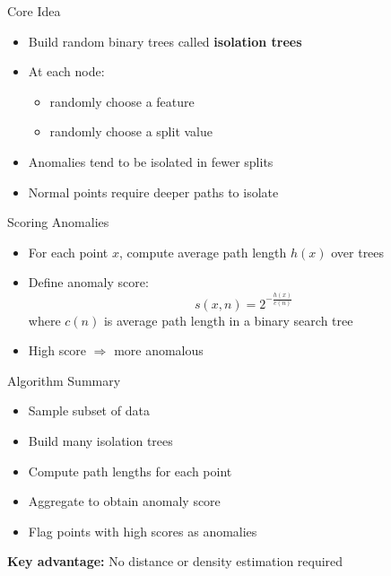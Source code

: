 \begin{frame}{Core Idea}
\begin{itemize}
    \item Build random binary trees called \textbf{isolation trees}
    \item At each node:
    \begin{itemize}
        \item randomly choose a feature
        \item randomly choose a split value
    \end{itemize}
    \item Anomalies tend to be isolated in fewer splits
    \item Normal points require deeper paths to isolate
\end{itemize}
\end{frame}
\newpage

\begin{frame}{Scoring Anomalies}
\begin{itemize}
    \item For each point $x$, compute average path length $h(x)$ over trees
    \item Define anomaly score:
    \[
    s(x, n) = 2^{-\frac{h(x)}{c(n)}}
    \]
    where $c(n)$ is average path length in a binary search tree
    \item High score $\Rightarrow$ more anomalous
\end{itemize}
\end{frame}
\newpage

\begin{frame}{Algorithm Summary}
\begin{itemize}
    \item Sample subset of data
    \item Build many isolation trees
    \item Compute path lengths for each point
    \item Aggregate to obtain anomaly score
    \item Flag points with high scores as anomalies
\end{itemize}
\vspace{0.3cm}
\textbf{Key advantage:} No distance or density estimation required
\end{frame}
\newpage

